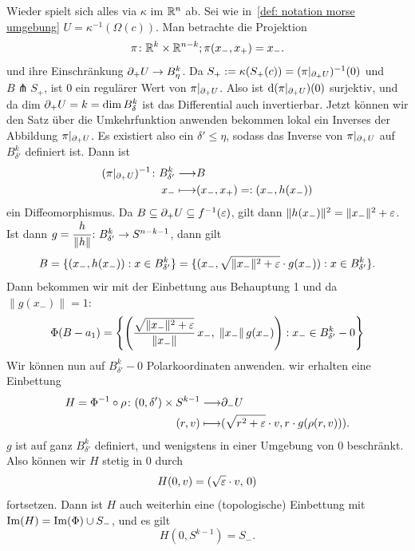 \begin{bigproof}
    \begin{smallproof}
        Wieder spielt sich alles via $\kappa$ im ${ \mathbb R }^n$ ab. Sei wie 
        in~\ref{def: notation morse umgebung} $U = \kappa^{-1}(\Omega (c))$.
        Man betrachte die Projektion
        \[ \pi \colon { \mathbb R }^k \times { \mathbb R }^{n - k} ; \pi (x_-, x_+) = x_- . \]
        und ihre Einschränkung ${ \partial }_+ U \to B_{\eta}^k$.
         Da $S_+ := \kappa(S_+(c)) = (\pi|_{{ \partial }_+U})^{-1}(0)$
        und $B \pitchfork S_+$, ist $0$ ein regulärer Wert von $\pi|_{{ \partial }_+U}$.
        Also ist ${ \operatorname{d} } ( \pi|_{{ \partial }_+U} )(0)$ surjektiv, und da dim ${ \partial }_+U = k = \dim B^k_{\delta}$ ist
        das Differential auch invertierbar. Jetzt können wir den Satz über die Umkehrfunktion anwenden 
        bekommen lokal ein Inverses der Abbildung $\pi|_{{ \partial }_+U}$. Es existiert also ein 
        $\delta' \leq \eta$, sodass das Inverse von $\pi|_{{ \partial }_+U}$ auf $B^k_{\delta'}$ definiert 
        ist. Dann ist 
        \begin{align*}
            (\pi|_{{ \partial }_+U})^{-1} \colon B^k_{\delta'} \longrightarrow & B \\
            x_- \longmapsto & (x_-, x_+) =: (x_-, h(x_-))
        \end{align*}
        ein Diffeomorphismus. Da $B \subseteq { \partial }_+U \subseteq f^{-1}(\varepsilon)$, gilt dann 
        $\| h(x_-) \|^2 = \| x_- \|^2 + \varepsilon $. Ist dann 
        $g = \cfrac{h}{\| h \|} \colon B^k_{\delta'} \to S^{n - k - 1}$, dann gilt
        \[ B = \{ (x_-, h(x_-)): x \in B^k_{\delta'} \} 
            = \{ (x_-, \sqrt{\| x_- \|^2 + \varepsilon} \cdot g(x_-)): x \in B^k_{\delta'} \} . \]
        Dann bekommen wir mit der Einbettung aus Behauptung 1 und da $\| g(x_-) \| = 1$:
        \[ \Phi(B - a_1) = 
            \left\{ \left( \frac{\sqrt{\| x_- \|^2 + \varepsilon}}{\| x_- \|} \, x_-, \; 
                    \| x_- \| \, g(x_-) \right) : 
                x_- \in B^k_{\delta'} - 0 \right\} \]
        Wir können nun auf $B^k_{\delta'} - 0$ Polarkoordinaten anwenden. wir erhalten eine 
        Einbettung
        \begin{align*}
            H = \Phi^{-1} \circ \rho \colon (0, \delta') \times S^{k-1} \longrightarrow & { \partial }_- U \\
            (r, v) \longmapsto & ( \sqrt{r^2 + \varepsilon} \cdot v, r \cdot g(\rho(r, v))) .
        \end{align*}
        $g$ ist auf ganz $B^k_{\delta'}$ definiert, und wenigstens in einer Umgebung von $0$ 
        beschränkt. Also können wir $H$ stetig in $0$ durch
        \[ H(0, v) = (\sqrt{\varepsilon} \cdot v, \, 0) \]
        fortsetzen. Dann ist $H$ auch weiterhin eine (topologische) Einbettung mit 
        ${ \operatorname{Im} } (H) = { \operatorname{Im} } (\Phi) \cup S_- $, und es gilt 
        \[ H(0, S^{k - 1}) = S_- . \]
    \end{smallproof}


\end{bigproof}

